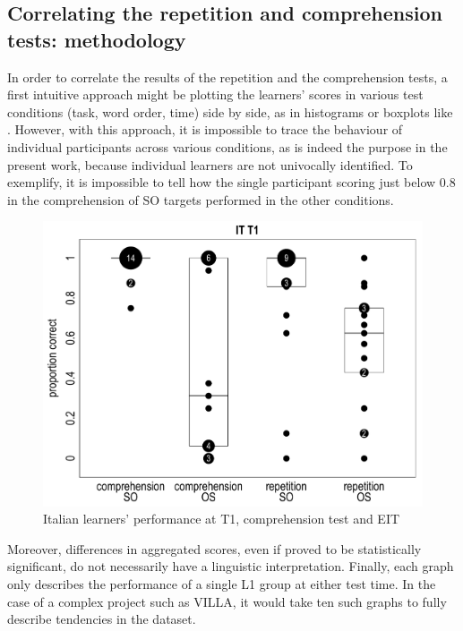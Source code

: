 \subsection{Correlating the repetition and comprehension tests: methodology}\label{sec:06:2.1}

In order to correlate the results of the repetition and the comprehension tests, a first intuitive approach might be plotting the learners' scores in various test conditions (task, word order, time) side by side, as in histograms or boxplots like . However, with this approach, it is impossible to trace the behaviour of individual participants across various conditions, as is indeed the purpose in the present work, because individual learners are not univocally identified. To exemplify, it is impossible to tell how the single participant scoring just below 0.8 in the comprehension of SO targets performed in the other conditions.

\begin{figure}
    \includegraphics[width=\textwidth]{figures/06-1.pdf}
    \caption{Italian learners’ performance at T1, comprehension test and EIT}
    \label{fig:06:1}
\end{figure}

Moreover, differences in aggregated scores, even if proved to be statistically significant, do not necessarily have a linguistic interpretation. Finally, each graph only describes the performance of a single L1 group at either test time. In the case of a complex project such as VILLA, it would take ten such graphs to fully describe tendencies in the dataset.


